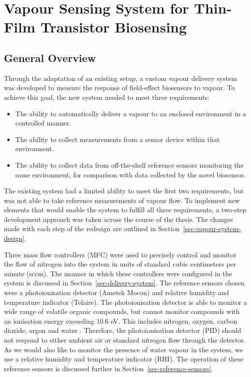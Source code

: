 \documentclass[
  a4paper,
]{scrbook}
\begin{document}

\hypertarget{sec-vapour-sensing-biosensors}{%
\chapter{Vapour Sensing System for Thin-Film Transistor
Biosensing}\label{sec-vapour-sensing-biosensors}}

\hypertarget{general-overview-1}{%
\section{General Overview}\label{general-overview-1}}

Through the adaptation of an existing setup, a custom vapour delivery
system was developed to measure the response of field-effect biosensors
to vapour. To achieve this goal, the new system needed to meet three
requirements:

\begin{itemize}
\item
  The ability to automatically deliver a vapour to an enclosed
  environment in a controlled manner.
\item
  The ability to collect measurements from a sensor device within that
  environment.
\item
  The ability to collect data from off-the-shelf reference sensors
  monitoring the same environment, for comparison with data collected by
  the novel biosensor.
\end{itemize}

The existing system had a limited ability to meet the first two
requirements, but was not able to take reference measurements of vapour
flow. To implement new elements that would enable the system to fulfill
all three requirements, a two-step development approach was taken across
the course of the thesis. The changes made with each step of the
redesign are outlined in Section~\ref{sec-vapour-system-design}.

Three mass flow controllers (MFC) were used to precisely control and
monitor the flow of nitrogen into the system in units of standard cubic
centimeters per minute (sccm). The manner in which these controllers
were configured in the system is discussed in
Section~\ref{sec-delivery-system}. The reference sensors chosen were a
photoionisation detector (Ametek Mocon) and relative humidity and
temperature indicator (Telaire). The photoionisation detector is able to
monitor a wide range of volatile organic compounds, but cannot monitor
compounds with an ionisation energy exceeding 10.6 eV. This includes
nitrogen, oxygen, carbon dioxide, argon and water
\autocite{PIDmanual,Ionscience}. Therefore, the photoionisation detector
(PID) should not respond to either ambient air or standard nitrogen flow
through the detector. As we would also like to monitor the presence of
water vapour in the system, we use a relative humidity and temperature
indicator (RHI). The operation of these reference sensors is discussed
further in Section~\ref{sec-reference-sensors}.
\end{document}

